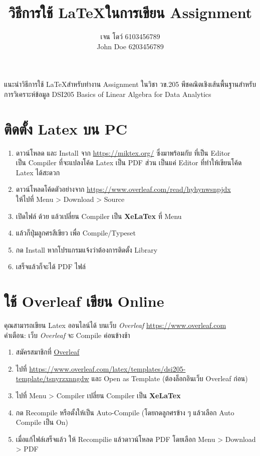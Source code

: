 \documentclass[12pt,a4paper]{article} %
\author{เจน โดว์ 6103456789 \\ John Doe 6203456789}
\title{วิธีการใช้ \LaTeX ในการเขียน Assignment}
\begin{document}
\maketitle

แนะนำวิธีการใช้ \LaTeX สำหรับทำงาน Assignment ในวิชา วข.205	พีชคณิตเชิงเส้นพื้นฐานสำหรับการวิเคราะห์ข้อมูล		
DSI205	Basics of Linear Algebra for Data Analytics

\section{ติดตั้ง Latex บน PC}
\begin{enumerate}
\item ดาวน์โหลด และ Install  จาก \url{https://miktex.org/} ซึ่งมาพร้อมกับ  ที่เป็น Editor \\
 เป็น Compiler ที่จะแปลงโค้ด Latex เป็น PDF ส่วน  เป็นแค่ Editor ที่ทำให้เขียนโค้ด Latex ได้สะดวก
\item ดาวน์โหลดโค้ดตัวอย่างจาก \url{https://www.overleaf.com/read/hyhynwsnpjdx}  \\
ให้ไปที่ Menu > Download > Source
\item เปิดไฟล์  ด้วย  แล้วเปลี่ยน Compiler เป็น \textbf{XeLaTex} ที่ Menu
\item แล้วก็ปุ่มลูกศรสีเขียว เพื่อ Compile/Typeset
\item กด Install หากโปรแกรมแจ้งว่าต้องการติดตั้ง Library
\item เสร็จแล้วก็จะได้ PDF ไฟล์
\end{enumerate}


\section{ใช้ Overleaf เขียน Online}
คุณสามารถเขียน Latex ออนไลน์ได้ บนเว็บ \emph{Overleaf} \url{https://www.overleaf.com} \\
คำเตือน: เว็บ \emph{Overleaf} จะ Compile ค่อนข้างช้า
\begin{enumerate}
\item สมัครสมาชิกที่ \href{https://www.overleaf.com}{Overleaf}
\item ไปที่ \url{https://www.overleaf.com/latex/templates/dsi205-template/tsnyrzxnngdw} และ Open as Template (ต้องล็อกอินเว็บ Overleaf ก่อน)
\item ไปที่ Menu > Compiler เปลี่ยน Compiler เป็น \textbf{XeLaTex}
\item กด Recompile หรือตั้งให้เป็น Auto-Compile (โดยกดลูกศรข้าง ๆ แล้วเลือก Auto Compile เป็น On)
\item เมื่อแก้ไฟล์เสร็จแล้ว ให้ Recompilie แล้วดาวน์โหลด PDF โดยเลือก Menu > Download > PDF
\end{enumerate}
\end{document}
